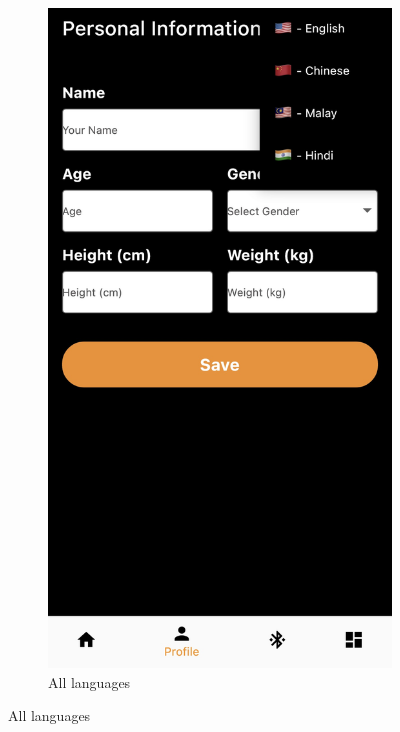 \documentclass[a4paper]{scrreprt}
\begin{document}
\vspace*{4.2cm}
\begin{figure}[htbp]
    \centering
    \begin{subfigure}{0.45\textwidth}
        \centering
        \includegraphics[scale=0.15]{languages_all.jpeg}
        \caption{All languages}
        \label{fig:graph1}

\end{subfigure}
\end{figure}
\end{document}
